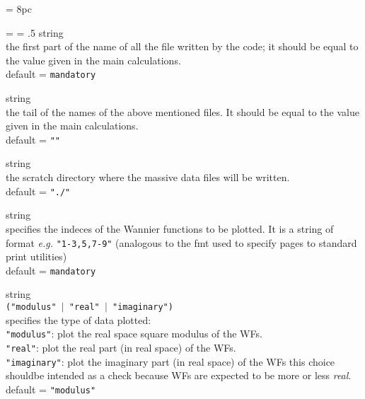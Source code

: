 \newdimen\descindent \descindent = 8pc
{\noindent \leftskip = \descindent \parskip = .5\baselineskip
{}%
{\sc string} \\ the first part of the name of all the file written by the code;
              it should be equal to the value given in the main calculations.\\
              {\sc default} = {\tt mandatory} \par

\noindent{}%
{\sc string} \\ the tail of the names of the above mentioned files. 
              It should be equal to the value given in the main calculations.\\
              {\sc default} = {\tt ""} \par

\noindent{}%
{\sc string} \\ the scratch directory where the massive data files will be written.\\
              {\sc default} = {\tt "./"} \par

\noindent{}%
{\sc string} \\ specifies the indeces of the Wannier functions to be plotted.
              It is a string of format {\it e.g.} {\tt "1-3,5,7-9"} 
              (analogous to the fmt used to specify pages to standard print utilities)\\
              {\sc default} = {\tt mandatory} \par

\noindent{}%
{\sc string} \\ {\tt ("modulus" $\mid$ "real" $\mid$ "imaginary") }\\
              specifies the type of data plotted:\\
                {\tt "modulus"}:    plot the real space square modulus of the WFs. \\
                {\tt "real"}:       plot the real part (in real space) of the WFs. \\
                {\tt "imaginary"}:  plot the imaginary part (in real space) of the WFs
                              this choice shouldbe intended as a check because WFs
                              are expected to be more or less {\it real}.\\
              {\sc default} = {\tt "modulus"} \par

}
